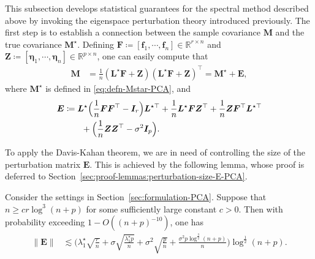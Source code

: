 This subsection develops statistical guarantees for the spectral method described above by invoking the eigenspace perturbation theory introduced previously.
The first step is to establish a connection between the sample covariance $\bm{M}$ and the true covariance $\bm{M}^{\star}$.
Defining $\bm{F}\coloneqq[\bm{f}_{1},\cdots,\bm{f}_{n}]\in\mathbb{R}^{r\times n}$
and $\bm{Z}\coloneqq[\bm{\eta}_{1},\cdots,\bm{\eta}_{n}]\in\mathbb{R}^{p\times n}$,
one can easily compute that
%
\begin{align}
\bm{M} & = \frac{1}{n} (\bm{L}^{\star}\bm{F}+\bm{Z})(\bm{L}^{\star}\bm{F}+\bm{Z})^{\top}=\bm{M}^{\star}+\bm{E},
\label{eq:connection-M-Mstar-E-PCA}
\end{align}
%
where $\bm{M}^{\star}$ is defined in \eqref{eq:defn-Mstar-PCA}, and
%
\begin{align}
\bm{E}  & \coloneqq\bm{L}^{\star}\Big(\frac{1}{n}\bm{F}\bm{F}^{\top}-\bm{I}_r \Big)\bm{L}^{\star\top}+\frac{1}{n}\bm{L}^{\star}\bm{F}\bm{Z}^{\top} +\frac{1}{n}\bm{Z}\bm{F}^{\top}\bm{L}^{\star\top}  \notag \\
  &\qquad +  \Big( \frac{1}{n}\bm{Z}\bm{Z}^{\top} -\sigma^2 \bm{I}_p \Big).
\label{eq:defn-E-PCA}
\end{align}
%


To apply the Davis-Kahan theorem, we are in need of controlling the size of the perturbation matrix $\bm{E}$.
This is achieved by the following lemma, whose proof is deferred to Section~\ref{sec:proof-lemmas:perturbation-size-E-PCA}.
%
\begin{lemma}
\label{lemma:perturbation-size-E-PCA}
Consider the settings in Section~\ref{sec:formulation-PCA}. Suppose that $n\geq c r\log^{3}(n+p)$ for some sufficiently large constant $c>0$. Then with probability exceeding $1-O((n+p)^{-10})$, one has
%
\begin{align*}
	\|\bm{E}\| & \lesssim\Bigg(\lambda_{1}^{\star}\sqrt{\frac{r}{n}}+\sigma\sqrt{\frac{\lambda_{1}^{\star}p}{n}}+\sigma^{2}\sqrt{\frac{p}{n}} + \frac{\sigma^2 p\log^{\frac{3}{2}}(n+p)}{n} \Bigg)\log^{\frac{1}{2}}(n+p).
\end{align*}
%
\end{lemma}

